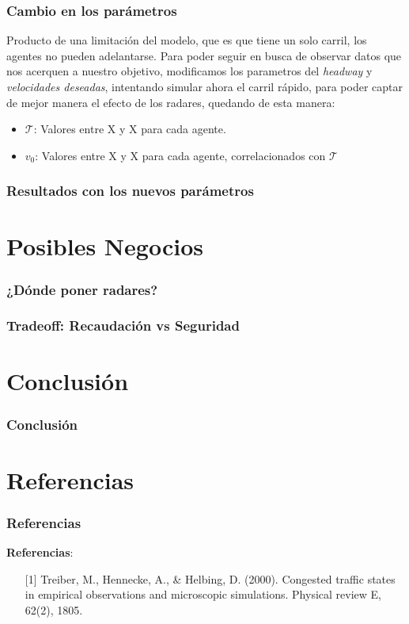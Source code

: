 \documentclass[10pt, compress]{beamer}
\begin{document}
\begin{frame}
\frametitle{Cambio en los par\'ametros}

Producto de una limitaci\'on del modelo, que es que tiene un solo carril, los agentes no pueden adelantarse. Para poder seguir en busca de observar datos que nos acerquen a nuestro objetivo, modificamos los parametros del \textit{headway} y \textit{velocidades deseadas}, intentando simular ahora el carril r\'apido, para poder captar de mejor manera el efecto de los radares, quedando de esta manera:

\begin{itemize}
\item $\mathcal{T}$: Valores entre X y X para cada agente.
\item $v_0$: Valores entre X y X para cada agente, correlacionados con  $\mathcal{T}$
\end{itemize}

\end{frame}

\begin{frame}
\frametitle{Resultados con los nuevos par\'ametros}
\end{frame}

\section{Posibles Negocios}

\begin{frame}
\frametitle{¿D\'onde poner radares?}
\end{frame}

\begin{frame}
\frametitle{Tradeoff: Recaudaci\'on vs Seguridad}
\end{frame}

\section{Conclusi\'on}

\begin{frame}
\frametitle{Conclusi\'on}
\end{frame}

\section{Referencias}

\begin{frame}[fragile]

\frametitle{Referencias}

\textbf{Referencias}:
\begin{itemize}
\item [{[1]}] Treiber, M., Hennecke, A., \& Helbing, D. (2000). Congested traffic states in empirical observations and microscopic simulations. Physical review E, 62(2), 1805.
\end{itemize}

\end{frame}

\end{document}
